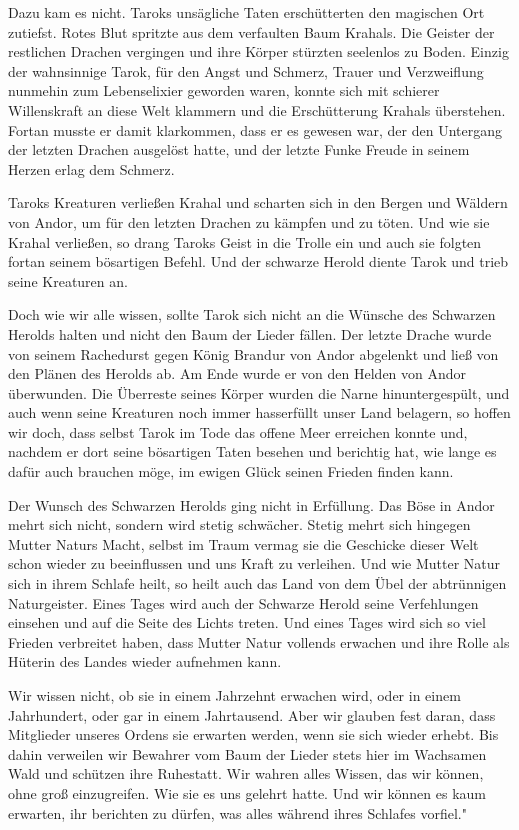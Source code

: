 \documentclass[10pt, a4paper, oneside]{book}
\begin{document}
Dazu kam es nicht. Taroks unsägliche Taten erschütterten den magischen Ort zutiefst. Rotes Blut spritzte aus dem verfaulten Baum Krahals. Die Geister der restlichen Drachen vergingen und ihre Körper stürzten seelenlos zu Boden. Einzig der wahnsinnige Tarok, für den Angst und Schmerz, Trauer und Verzweiflung nunmehin zum Lebenselixier geworden waren, konnte sich mit schierer Willenskraft an diese Welt klammern und die Erschütterung Krahals überstehen. Fortan musste er damit klarkommen, dass er es gewesen war, der den Untergang der letzten Drachen ausgelöst hatte, und der letzte Funke Freude in seinem Herzen erlag dem Schmerz.

Taroks Kreaturen verließen Krahal und scharten sich in den Bergen und Wäldern von Andor, um für den letzten Drachen zu kämpfen und zu töten. Und wie sie Krahal verließen, so drang Taroks Geist in die Trolle ein und auch sie folgten fortan seinem bösartigen Befehl. Und der schwarze Herold diente Tarok und trieb seine Kreaturen an.

Doch wie wir alle wissen, sollte Tarok sich nicht an die Wünsche des Schwarzen Herolds halten und nicht den Baum der Lieder fällen. Der letzte Drache wurde von seinem Rachedurst gegen König Brandur von Andor abgelenkt und ließ von den Plänen des Herolds ab. Am Ende wurde er von den Helden von Andor überwunden. Die Überreste seines Körper wurden die Narne hinuntergespült, und auch wenn seine Kreaturen noch immer hasserfüllt unser Land belagern, so hoffen wir doch, dass selbst Tarok im Tode das offene Meer erreichen konnte und, nachdem er dort seine bösartigen Taten besehen und berichtig hat, wie lange es dafür auch brauchen möge, im ewigen Glück seinen Frieden finden kann.

Der Wunsch des Schwarzen Herolds ging nicht in Erfüllung. Das Böse in Andor mehrt sich nicht, sondern wird stetig schwächer. Stetig mehrt sich hingegen Mutter Naturs Macht, selbst im Traum vermag sie die Geschicke dieser Welt schon wieder zu beeinflussen und uns Kraft zu verleihen. Und wie Mutter Natur sich in ihrem Schlafe heilt, so heilt auch das Land von dem Übel der abtrünnigen Naturgeister. Eines Tages wird auch der Schwarze Herold seine Verfehlungen einsehen und auf die Seite des Lichts treten. Und eines Tages wird sich so viel Frieden verbreitet haben, dass Mutter Natur vollends erwachen und ihre Rolle als Hüterin des Landes wieder aufnehmen kann.

Wir wissen nicht, ob sie in einem Jahrzehnt erwachen wird, oder in einem Jahrhundert, oder gar in einem Jahrtausend. Aber wir glauben fest daran, dass Mitglieder unseres Ordens sie erwarten werden, wenn sie sich wieder erhebt. Bis dahin verweilen wir Bewahrer vom Baum der Lieder stets hier im Wachsamen Wald und schützen ihre Ruhestatt. Wir wahren alles Wissen, das wir können, ohne groß einzugreifen. Wie sie es uns gelehrt hatte. Und wir können es kaum erwarten, ihr berichten zu dürfen, was alles während ihres Schlafes vorfiel."
\end{document}
